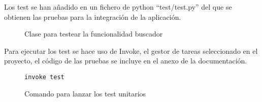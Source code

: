 Los test se han añadido en un fichero de python ``test/test.py'' del que se obtienen las pruebas para la integración de la aplicación.
\begin{figure}[h!]
    \centering
    \caption{Clase para testear la funcionalidad buscador}
    \label{fig:test}
\end{figure}

Para ejecutar los test se hace uso de Invoke, el gestor de tareas seleccionado en el proyecto, el código de las pruebas se incluye en el anexo de la documentación. 

\begin{figure}
    \centering
    \begin{lstlisting}[style=consola]
        invoke test
    \end{lstlisting}
    \caption{Comando para lanzar los test unitarios}
    \label{cmd:test}
\end{figure}